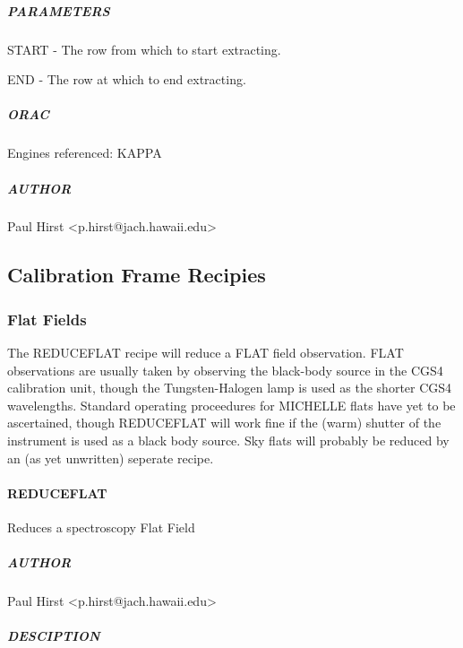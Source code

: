 \documentclass[twoside,11pt]{article}
\renewcommand{\_}{\texttt{\symbol{95}}}
\begin{document}
\subparagraph*{PARAMETERS\label{_EMISSIVITY_--_Calculates_Telescope_Emissivity_PARAMETERS}}

START - The row from which to start extracting.



END - The row at which to end extracting.

\subparagraph*{ORAC\label{_EMISSIVITY_--_Calculates_Telescope_Emissivity_ORAC}}

Engines referenced: KAPPA

\subparagraph*{AUTHOR\label{_EMISSIVITY_--_Calculates_Telescope_Emissivity_AUTHOR}}

Paul Hirst <p.hirst@jach.hawaii.edu>


\subsection{Calibration Frame Recipies}

\subsubsection{Flat Fields}

The REDUCE\_FLAT recipe will reduce a FLAT field observation. FLAT
observations are usually taken by observing the black-body source in
the CGS4 calibration unit, though the Tungsten-Halogen lamp is used as
the shorter CGS4 wavelengths. Standard operating proceedures for
MICHELLE flats have yet to be ascertained, though REDUCE\_FLAT will
work fine if the (warm) shutter of the instrument is used as a black
body source. Sky flats will probably be reduced by an (as yet
unwritten) seperate recipe.

\paragraph*{REDUCE\_FLAT\label{REDUCE_FLAT}}

Reduces a spectroscopy Flat Field

\subparagraph*{AUTHOR\label{REDUCE_FLAT_AUTHOR}}

Paul Hirst <p.hirst@jach.hawaii.edu>

\subparagraph*{DESCIPTION\label{REDUCE_FLAT_DESCIPTION}}
\end{document}
